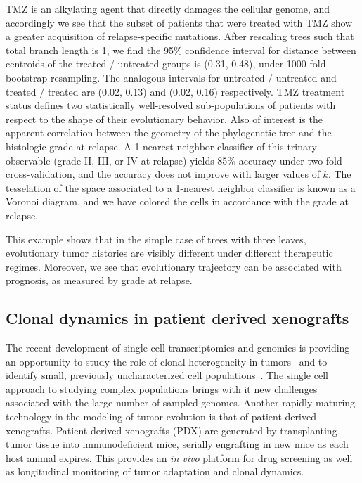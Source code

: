 \documentclass[a4paper,11pt]{article}
\begin{document}
TMZ is an alkylating agent that directly damages the cellular genome, and accordingly we see that the subset of patients that were treated with TMZ show a greater acquisition of relapse-specific mutations.
After rescaling trees such that total branch length is 1, we find the 95\% confidence interval for distance between centroids of the treated / untreated groups is (0.31, 0.48), under 1000-fold bootstrap resampling.
The analogous intervals for untreated / untreated and treated / treated are (0.02, 0.13) and (0.02, 0.16) respectively.
TMZ treatment status defines two statistically well-resolved sub-populations of patients with respect to the shape of their evolutionary behavior.
Also of interest is the apparent correlation between the geometry of the phylogenetic tree and the histologic grade at relapse.
A 1-nearest neighbor classifier of this trinary observable (grade II, III, or IV at relapse) yields 85\% accuracy under two-fold cross-validation, and the accuracy does not improve with larger values of $k$.
The tesselation of the space associated to a 1-nearest neighbor classifier is known as a Voronoi diagram, and we have colored the cells in accordance with the grade at relapse.

This example shows that in the simple case of trees with three leaves, evolutionary tumor histories are visibly different under different therapeutic regimes.
Moreover, we see that evolutionary trajectory can be associated with prognosis, as measured by grade at relapse.

\subsection{Clonal dynamics in patient derived xenografts}\label{sec:xeno}

The recent development of single cell transcriptomics and genomics is providing an opportunity to study the role of clonal heterogeneity in tumors~\cite{navin2011tumour, eirew2014dynamics, patel2014single} and to identify small, previously uncharacterized cell populations~\cite{grun2015single}.
The single cell approach to studying complex populations brings with it new challenges associated with the large number of sampled genomes.
Another rapidly maturing technology in the modeling of tumor evolution is that of patient-derived xenografts.
Patient-derived xenografts (PDX) are generated by transplanting tumor tissue into immunodeficient mice, serially engrafting in new mice as each host animal expires.
This provides an \textit{in vivo} platform for drug screening as well as longitudinal monitoring of tumor adaptation and clonal dynamics.
\end{document}
